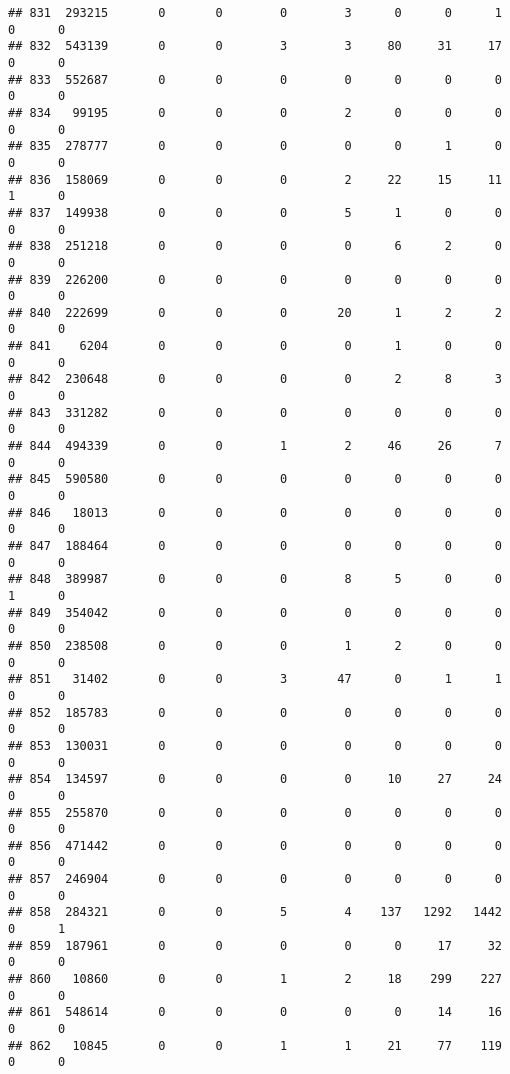\documentclass[
]{article}
\begin{document}
\begin{verbatim}
## 831  293215       0       0        0        3      0      0      1     0      0
## 832  543139       0       0        3        3     80     31     17     0      0
## 833  552687       0       0        0        0      0      0      0     0      0
## 834   99195       0       0        0        2      0      0      0     0      0
## 835  278777       0       0        0        0      0      1      0     0      0
## 836  158069       0       0        0        2     22     15     11     1      0
## 837  149938       0       0        0        5      1      0      0     0      0
## 838  251218       0       0        0        0      6      2      0     0      0
## 839  226200       0       0        0        0      0      0      0     0      0
## 840  222699       0       0        0       20      1      2      2     0      0
## 841    6204       0       0        0        0      1      0      0     0      0
## 842  230648       0       0        0        0      2      8      3     0      0
## 843  331282       0       0        0        0      0      0      0     0      0
## 844  494339       0       0        1        2     46     26      7     0      0
## 845  590580       0       0        0        0      0      0      0     0      0
## 846   18013       0       0        0        0      0      0      0     0      0
## 847  188464       0       0        0        0      0      0      0     0      0
## 848  389987       0       0        0        8      5      0      0     1      0
## 849  354042       0       0        0        0      0      0      0     0      0
## 850  238508       0       0        0        1      2      0      0     0      0
## 851   31402       0       0        3       47      0      1      1     0      0
## 852  185783       0       0        0        0      0      0      0     0      0
## 853  130031       0       0        0        0      0      0      0     0      0
## 854  134597       0       0        0        0     10     27     24     0      0
## 855  255870       0       0        0        0      0      0      0     0      0
## 856  471442       0       0        0        0      0      0      0     0      0
## 857  246904       0       0        0        0      0      0      0     0      0
## 858  284321       0       0        5        4    137   1292   1442     0      1
## 859  187961       0       0        0        0      0     17     32     0      0
## 860   10860       0       0        1        2     18    299    227     0      0
## 861  548614       0       0        0        0      0     14     16     0      0
## 862   10845       0       0        1        1     21     77    119     0      0

\end{verbatim}
\end{document}
